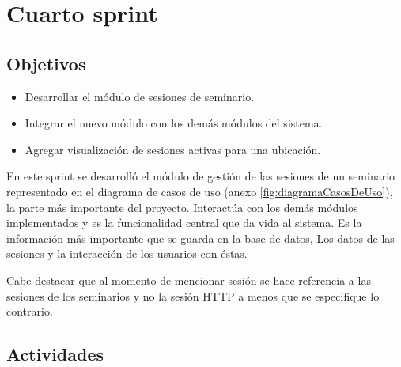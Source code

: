 \section{Cuarto sprint} %
\label{sec:cuarto_sprint}

\subsection{Objetivos}

\begin{itemize}
	\item Desarrollar el módulo de sesiones de seminario.
	\item Integrar el nuevo módulo con los demás módulos del sistema.
	\item Agregar visualización de sesiones activas para una ubicación.
\end{itemize}

En este sprint se desarrolló el módulo de gestión de las sesiones de un seminario representado en el diagrama de casos de uso (anexo \ref{fig:diagramaCasosDeUso}), la parte más importante del proyecto. Interactúa con los demás módulos implementados y es la funcionalidad central que da vida al sistema. Es la información más importante que se guarda en la base de datos, Los datos de las sesiones y la interacción de los usuarios con éstas.

Cabe destacar que al momento de mencionar sesión se hace referencia a las sesiones de los seminarios y no la sesión HTTP a menos que se especifique lo contrario.

\subsection{Actividades} %
\label{sub:actividades4}

